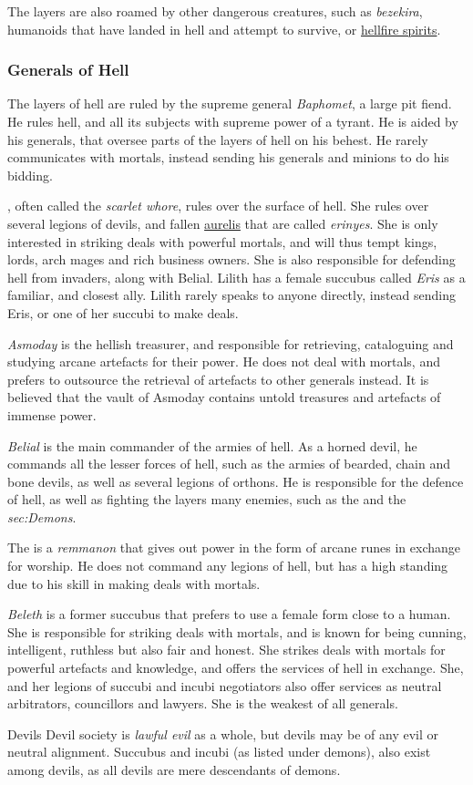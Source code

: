 The layers are also roamed by other dangerous creatures, such as
\emph{bezekira}, humanoids that have landed in hell and attempt to survive,
or \hyperref[sec:Hellfire Spirit]{hellfire spirits}.

\subsubsection{Generals of Hell}

The layers of hell are ruled by the supreme general \emph{Baphomet}, a large
pit fiend. He rules hell, and all its subjects with supreme power of a
tyrant. He is aided by his generals, that oversee parts of the layers of
hell on his behest. He rarely communicates with mortals, instead sending his
generals and minions to do his bidding.

, often called the \emph{scarlet whore}, rules over the
surface of hell. She rules over several legions of devils, and fallen
\hyperref[sec:Aurelis]{aurelis} that are called \emph{erinyes}. She is only
interested in striking deals with powerful mortals, and will thus tempt kings,
lords, arch mages and rich business owners. She is also responsible for
defending hell from invaders, along with Belial. Lilith has a female succubus
called \emph{Eris} as a familiar, and closest ally. Lilith rarely speaks to
anyone directly, instead sending Eris, or one of her succubi to make deals.

\emph{Asmoday} is the hellish treasurer, and responsible for retrieving,
cataloguing and studying arcane artefacts for their power. He does not deal
with mortals, and prefers to outsource the retrieval of artefacts to other
generals instead. It is believed that the vault of Asmoday contains untold
treasures and artefacts of immense power.

\emph{Belial} is the main commander of the armies of hell. As a horned devil,
he commands all the lesser forces of hell, such as the armies of bearded,
chain and bone devils, as well as several legions of orthons. He is
responsible for the defence of hell, as well as fighting the layers many
enemies, such as the  and the \emph{sec:Demons}.

The  is a \emph{remmanon} that gives out power in the
form of arcane runes in exchange for worship. He does not command any legions
of hell, but has a high standing due to his skill in making deals with mortals.

\emph{Beleth} is a former succubus that prefers to use a female form close to
a human. She is responsible for striking deals with mortals, and is known for
being cunning, intelligent, ruthless but also fair and honest. She strikes
deals with mortals for powerful artefacts and knowledge, and offers the
services of hell in exchange. She, and her legions of succubi and incubi
negotiators also offer services as neutral arbitrators, councillors and
lawyers. She is the weakest of all generals.

\begin{35e}{Devils}
  Devil society is \emph{lawful evil} as a whole, but devils may be of any
  evil or neutral alignment. Succubus and incubi (as listed under demons),
  also exist among devils, as all devils are mere descendants of demons.
\end{35e}
